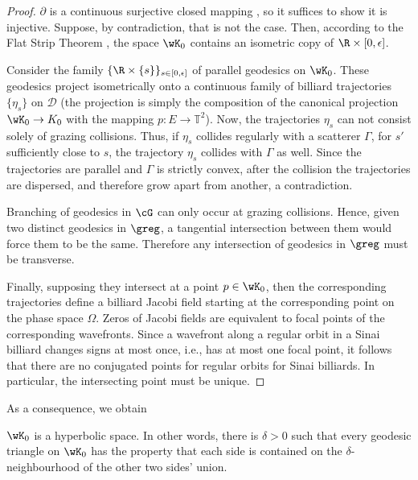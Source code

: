 \documentclass[reqno,11pt]{amsart}
\begin{document}
    \begin{proof}
        \(\partial\) is a continuous surjective closed mapping \cite{bankovic_marked-length-spectral_2017}, so it suffices to show it is injective. 
        Suppose, by contradiction, that is not the case.
        Then, according to the Flat Strip Theorem \cite{bridson2011metric}, the space \(\wK_0\) contains an isometric copy of \(\R \times [0,\epsilon]\).        
        \par Consider the family \( \{\R \times \{s\}\}_{s \in [0, \epsilon]} \) of parallel geodesics on \(\wK_0\).
        These geodesics project isometrically onto a continuous family of billiard trajectories \(\{\eta_s\}\) on \(\mathcal{D}\) (the projection is simply the composition of the canonical projection \(\wK_0  \to K_0\) with the mapping \( p\colon E \to \mathbb{T}^2 \)).
        Now, the trajectories \(\eta_s\) can not consist solely of grazing collisions.
        Thus, if \(\eta_s\) collides regularly with a scatterer \(\Gamma\), for \(s'\) sufficiently close to \(s\), the trajectory
        \(\eta_s\) collides with \(\Gamma\) as well.
        Since the trajectories are parallel and \(\Gamma\) is strictly convex, after the collision the trajectories are dispersed, and therefore grow apart from another, a contradiction. 
        \par Branching of geodesics in \(\cG\) can only occur at grazing collisions.
        Hence, given two distinct geodesics in \(\greg\), a tangential intersection between them would force them to be the same. Therefore any intersection of geodesics in \(\greg\) must be transverse.
        \par Finally, supposing they intersect at a point \(p \in \wK_0\), then the corresponding trajectories define a billiard Jacobi field \cite{wojtkowski_two_1994} starting at the corresponding point on the phase space \(\Omega\).
        Zeros of Jacobi fields are equivalent to focal points of the corresponding wavefronts. 
        Since a wavefront along a regular orbit in a Sinai billiard changes signs at most once, i.e., has at most one focal point,
        it follows that there are no conjugated points for regular orbits for Sinai billiards.
        In particular, the intersecting point must be unique.  
    \end{proof}
    As a consequence, we obtain
    \begin{corollary}
        \(\wK_0\) is a hyperbolic space. 
        In other words, there is \(\delta > 0\) such that every geodesic triangle on \(\wK_0\) has the property that each side is contained on the \(\delta\)-neighbourhood of the other two sides' union.
    \end{corollary}
\end{document}
